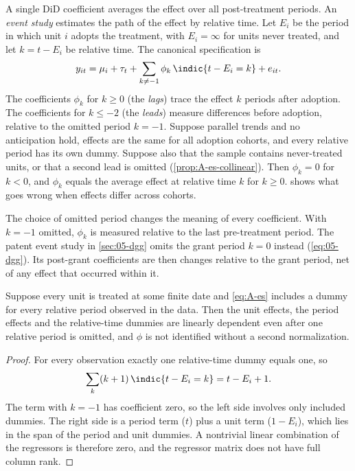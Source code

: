 A single DiD coefficient averages the effect over all post-treatment periods. An \emph{event study} estimates the
path of the effect by relative time. Let $E_i$ be the period in which unit $i$ adopts the treatment, with
$E_i=\infty$ for units never treated, and let $k=t-E_i$ be relative time. The canonical specification is
\begin{equation}\label{eq:A-es}
y_{it}=\mu_i+\tau_t+\sum_{k\ne-1}\phi_k\,\indic\{t-E_i=k\}+e_{it}.
\end{equation}
The coefficients $\phi_k$ for $k\ge0$ (the \emph{lags}) trace the effect $k$ periods after adoption. The coefficients
for $k\le-2$ (the \emph{leads}) measure differences before adoption, relative to the omitted period $k=-1$. Suppose
parallel trends and no anticipation hold, effects are the same for all adoption cohorts, and every relative period
has its own dummy. Suppose also that the sample contains never-treated units, or that a second lead is omitted
(\cref{prop:A-es-collinear}). Then $\phi_k=0$ for $k<0$, and $\phi_k$ equals the average effect at relative time $k$ for
$k\ge0$.  shows what
goes wrong when effects differ across cohorts.

The choice of omitted period changes the meaning of every coefficient. With $k=-1$ omitted, $\phi_k$ is measured
relative to the last pre-treatment period. The patent event study in \cref{sec:05-dgg} omits the grant period $k=0$
instead (\cref{eq:05-dgg}). Its post-grant coefficients are then changes relative to the grant period, net of any
effect that occurred within it.

\begin{proposition}\label{prop:A-es-collinear}
Suppose every unit is treated at some finite date and \eqref{eq:A-es} includes a dummy for every relative period
observed in the data. Then the unit effects, the period effects and the relative-time dummies are linearly dependent
even after one relative period is omitted, and $\phi$ is not identified without a second normalization.
\end{proposition}

\begin{proof}
For every observation exactly one relative-time dummy equals one, so
\begin{equation*}
\sum_{k}(k+1)\,\indic\{t-E_i=k\}=t-E_i+1 .
\end{equation*}
The term with $k=-1$ has coefficient zero, so the left side involves only included dummies. The right side is a
period term ($t$) plus a unit term ($1-E_i$), which lies in the span of the period and unit dummies. A nontrivial
linear combination of the regressors is therefore zero, and the regressor matrix does not have full column rank.
\end{proof}

